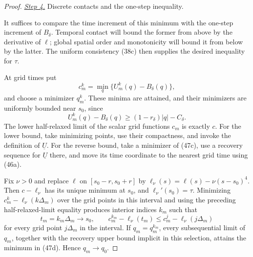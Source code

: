 \documentclass{aomart}
\theoremstyle{definition}
\newcommand{\1}{\mathbf 1}
\begin{document}
\begin{proof}
\smallskip\noindent
\underline{\textit{Step 4.}} Discrete contacts and the one-step inequality.

It suffices to compare the time increment of this minimum with the
one-step increment of $B_\delta$.  Temporal contact will bound the
former from above by the derivative of $\ell$; global spatial order
and monotonicity will bound it from below by the latter.  The uniform
consistency (38c) then supplies the desired inequality for $\tau$.

At grid times put
\begin{equation}
c_ m^k=\min_ q\{U_ m^k(q)-B_ \delta(q)\},
\tag{47g}
\end{equation}
and choose a minimizer $q_ m^k$.  These minima are attained, and their
minimizers are uniformly bounded near $s_ 0$, since
\begin{equation*}
U_ m^k(q)-B_ \delta(q)
\geq(1-r_ \delta)|q|-C_ \delta.
\end{equation*}
The lower half-relaxed limit of the scalar grid functions $c_ m$ is
exactly $c$.  For the lower bound, take minimizing points, use their
compactness, and invoke the definition of $\underline U$.  For the
reverse bound, take a minimizer of (47c), use a recovery sequence for
$\underline U$ there, and move its time coordinate to the nearest
grid time using (46a).

Fix $\nu>0$ and replace $\ell$ on
$[s_ 0-r,s_ 0+r]$ by
$\ell_ \nu(s)=\ell(s)-\nu(s-s_ 0)^4$.  Then
$c-\ell_ \nu$ has its unique minimum at $s_ 0$, and
$\ell_ \nu'(s_ 0)=\tau$.  Minimizing
$c_ m^k-\ell_ \nu(k\Delta_ m)$ over the grid points in this interval
and using the preceding half-relaxed-limit equality produces interior
indices $k_ m$ such that
\begin{equation}
t_ m=k_ m\Delta_ m\longrightarrow s_ 0,\qquad
c_ m^{k_ m}-\ell_ \nu(t_ m)
\leq c_ m^j-\ell_ \nu(j\Delta_ m)
\tag{47h}
\end{equation}
for every grid point $j\Delta_ m$ in the interval.  If
$q_ m=q_ m^{k_ m}$, every subsequential limit of $q_ m$, together with
the recovery upper bound implicit in this selection, attains the
minimum in (47d).  Hence $q_ m\to q_ 0$.


\end{proof}
\end{document}
